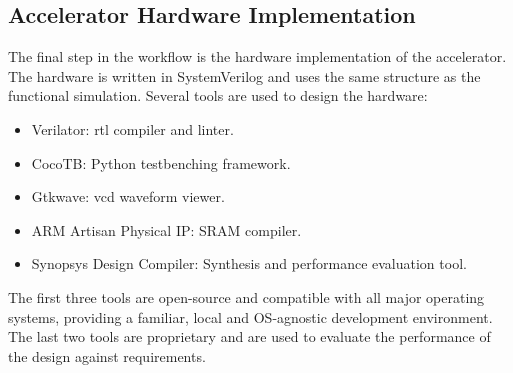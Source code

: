 \subsection{Accelerator Hardware Implementation}
The final step in the workflow is the hardware implementation of the accelerator. The hardware is written in SystemVerilog and uses the same structure as the functional simulation.
Several tools are used to design the hardware:
\begin{itemize}
    \item Verilator: \ac{rtl} compiler and linter.
    \item CocoTB: Python testbenching framework.
    \item Gtkwave: \ac{vcd} waveform viewer.
    \item ARM Artisan Physical IP: SRAM compiler.
    \item Synopsys Design Compiler: Synthesis and performance evaluation tool.
\end{itemize}
The first three tools are open-source and compatible with all major operating systems, providing a familiar, local and OS-agnostic development environment. The last two tools
are proprietary and are used to evaluate the performance of the design against requirements.
